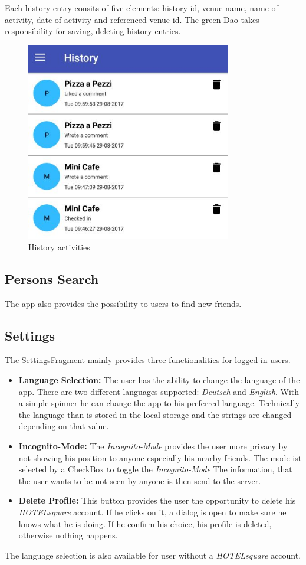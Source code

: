 Each history entry consits of five elements: history id, venue name, name  of activity, date of activity and referenced venue id. The green Dao takes responsibility for saving, deleting history entries. 
\begin{figure}[htbp]
	\includegraphics[width=0.8\textwidth]{images/history.jpg}
	\centering
	\caption[]{History activities}
	\label{fig:history}
\end{figure}

\subsection{Persons Search}
The app also provides the possibility to users to find new friends. 
\subsection{Settings}
The SettingsFragment mainly provides three functionalities for logged-in users.

\begin{itemize}
\item \textbf{Language Selection:} The user has the ability to change the language of the app. There are two different languages supported: \textit{Deutsch} and \textit{English}. With a simple spinner he can change the app to his preferred language. Technically the language than is stored in the local storage and the strings are changed depending on that value.
\item \textbf{Incognito-Mode:} The \textit{Incognito-Mode} provides the user more privacy by not showing his position to anyone especially his nearby friends. The mode ist selected by a CheckBox to toggle the \textit{Incognito-Mode} The information, that the user wants to be not seen by anyone is then send to the server.
\item \textbf{Delete Profile:} This button provides the user the opportunity to delete his \textit{HOTELsquare} account. If he clicks on it, a dialog is open to make sure he knows what he is doing. If he confirm his choice, his profile is deleted, otherwise nothing happens.
\end{itemize}

The language selection is also available for user without a \textit{HOTELsquare} account.


